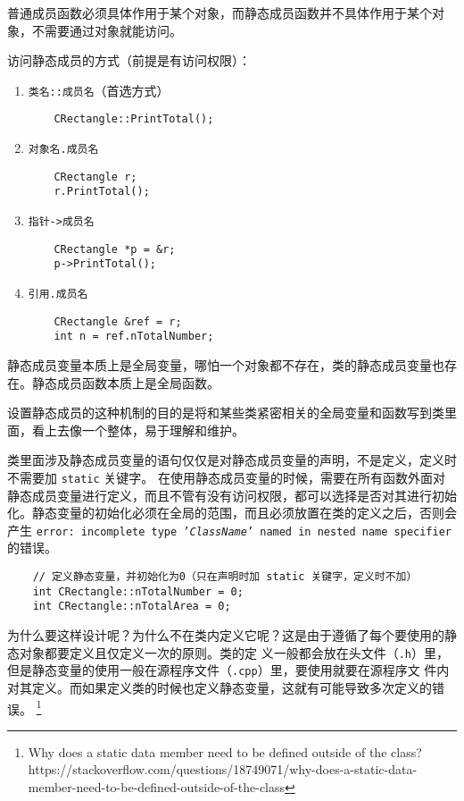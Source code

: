 \documentclass[UTF8]{ctexart}
\begin{document}
普通成员函数必须具体作用于某个对象，而静态成员函数并不具体作用于某个对象，不需要通过对象就能访问。

访问静态成员的方式（前提是有访问权限）：
\begin{enumerate}
    \item \texttt{类名::成员名}（首选方式）
    \begin{verbatim}
    CRectangle::PrintTotal();
    \end{verbatim}
    \item \texttt{对象名.成员名}
    \begin{verbatim}
    CRectangle r;
    r.PrintTotal();
    \end{verbatim}
    \item \texttt{指针->成员名}
    \begin{verbatim}
    CRectangle *p = &r;
    p->PrintTotal();
    \end{verbatim}
    \item \texttt{引用.成员名}
    \begin{verbatim}
    CRectangle &ref = r;
    int n = ref.nTotalNumber;
    \end{verbatim}
\end{enumerate}

静态成员变量本质上是全局变量，哪怕一个对象都不存在，类的静态成员变量也存在。静态成员函数本质上是全局函数。

设置静态成员的这种机制的目的是将和某些类紧密相关的全局变量和函数写到类里面，看上去像一个整体，易于理解和维护。

类里面涉及静态成员变量的语句仅仅是对静态成员变量的声明，不是定义，定义时不需要加 \texttt{static} 关键字。
在使用静态成员变量的时候，需要在所有函数外面对静态成员变量进行定义，而且不管有没有访问权限，都可以选择是否对其进行初始
化。静态变量的初始化必须在全局的范围，而且必须放置在类的定义之后，否则会产生
\texttt{error: incomplete type '\emph{ClassName}' named in nested name specifier} 的错误。
\begin{verbatim}
    // 定义静态变量，并初始化为0（只在声明时加 static 关键字，定义时不加）
    int CRectangle::nTotalNumber = 0;
    int CRectangle::nTotalArea = 0;
\end{verbatim}

为什么要这样设计呢？为什么不在类内定义它呢？这是由于遵循了每个要使用的静态对象都要定义且仅定义一次的原则。类的定
义一般都会放在头文件（\texttt{.h}）里，但是静态变量的使用一般在源程序文件（\texttt{.cpp}）里，要使用就要在源程序文
件内对其定义。而如果定义类的时候也定义静态变量，这就有可能导致多次定义的错误。
\footnote{Why does a static data member need to be defined outside of the class?
https://stackoverflow.com/questions/18749071/why-does-a-static-data-member-need-to-be-defined-outside-of-the-class}
\end{document}
